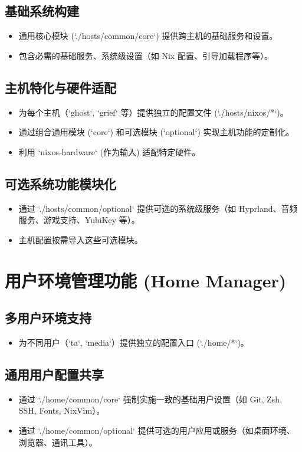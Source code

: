 \documentclass[11pt, a4paper]{article}
\begin{document}
    \subsection{基础系统构建}
        \begin{itemize}
            \item 通用核心模块 (`./hosts/common/core`) 提供跨主机的基础服务和设置。
            \item 包含必需的基础服务、系统级设置（如 Nix 配置、引导加载程序等）。
        \end{itemize}
    \subsection{主机特化与硬件适配}
        \begin{itemize}
            \item 为每个主机（`ghost`, `grief` 等）提供独立的配置文件 (`./hosts/nixos/*`)。
            \item 通过组合通用模块 (`core`) 和可选模块 (`optional`) 实现主机功能的定制化。
            \item 利用 `nixos-hardware` (作为输入) 适配特定硬件。
        \end{itemize}
    \subsection{可选系统功能模块化}
         \begin{itemize}
            \item 通过 `./hosts/common/optional` 提供可选的系统级服务（如 Hyprland、音频服务、游戏支持、YubiKey 等）。
            \item 主机配置按需导入这些可选模块。
        \end{itemize}

\section{用户环境管理功能 (Home Manager)}
    \subsection{多用户环境支持}
        \begin{itemize}
            \item 为不同用户（`ta`, `media`）提供独立的配置入口 (`./home/*`)。
        \end{itemize}
    \subsection{通用用户配置共享}
        \begin{itemize}
            \item 通过 `./home/common/core` 强制实施一致的基础用户设置（如 Git, Zsh, SSH, Fonts, NixVim）。
            \item 通过 `./home/common/optional` 提供可选的用户应用或服务（如桌面环境、浏览器、通讯工具）。
        \end{itemize}
\end{document}
